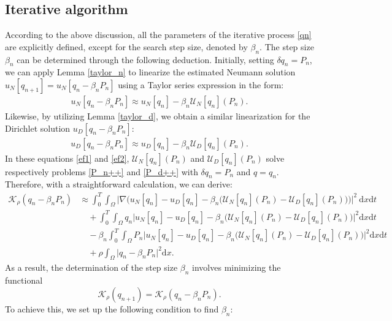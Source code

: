\documentclass[a4paper,12pt,reqno,natbib]{amsart}
\newcommand{\dx} {\displaystyle\mathrm{d}x}
\newcommand{\dt} {\displaystyle\mathrm{d}t}
\begin{document}
{%
\subsection{Iterative algorithm}\label{sec:Iterative-algo}

According to the above discussion, all the parameters of the iterative process \eqref{qn} are explicitly defined, except for the search step size, denoted by $\beta_n$. The step size $\beta_n$ can be determined through the following deduction.
Initially, setting $\delta q_n = P_n$, we can apply Lemma \ref{taylor_n} to linearize the estimated Neumann solution $u_N[q_{n+1}] = u_N[q_n - \beta_n P_{n}]$ using a Taylor series expression in the form:
\begin{align}\label{ef1}
   u_N[q_n -\beta_n P_{n}] \approx 
   u_N[q_{n}] - \beta_n  \mathcal{U}_{N}[q_n](P_n).
\end{align}
Likewise, by utilizing Lemma \ref{taylor_d}, we obtain a similar linearization for the Dirichlet solution $u_D[q_n - \beta_n P_n]$:
\begin{align}\label{ef2}
   u_D[q_n - \beta_n P_n] \approx u_D[q_{n}] - \beta_n  \mathcal{U}_{D}[q_n](P_n).
\end{align}
In these equations \eqref{ef1} and \eqref{ef2}, $\mathcal{U}_{N}[q_n](P_n)$ and $\mathcal{U}_{D}[q_n](P_n)$ solve respectively problems \eqref{P_n++} and \eqref{P_d++} with $\delta q_n = P_n$ and $q=q_n$. Therefore, with a straightforward calculation, we can derive:
\begin{align*}
    \mathcal{K}_\rho (q_n - \beta_n P_n)&\approx \int_0^T \int_{\Omega}\Big|\nabla\Big(
 u_N[q_{n}]- u_D[q_{n}] - \beta_n \Big( \mathcal{U}_{N}[q_n](P_n)-\mathcal{U}_{D}[q_n](P_n)\Big)\Big)\Big|^2\ \dx \dt \\
 &\quad+\int_0^T\int_{\Omega}q_{n}\Big| u_N[q_{n}]- u_D[q_{n}] - \beta_n  \Big( \mathcal{U}_{N}[q_n](P_n)-\mathcal{U}_{D}[q_n](P_n)\Big)\Big|^2 \dx \dt\\
 &\quad-\beta_n  \int_0^T\int_{\Omega}P_{n}\Big| u_N[q_{n}]- u_D[q_{n}] - \beta_n  \Big( \mathcal{U}_{N}[q_n](P_n)-\mathcal{U}_{D}[q_n](P_n)\Big)\Big|^2 \dx \dt\\
 &\quad+ \rho\int_{\Omega}\Big|q_n-\beta_n P_n\Big|^2\dx.
\end{align*}
As a result, the determination of the step size $\beta_n$ involves minimizing the functional
$$
\mathcal{K}_\rho (q_{n+1})=\mathcal{K}_\rho (q_n - \beta_n P_n).
$$
To achieve this, we set up the following condition to find $\beta_n$:
}
\end{document}

